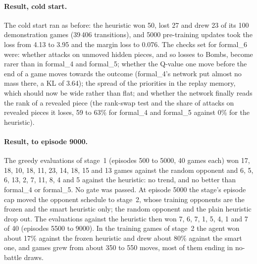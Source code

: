 \paragraph{Result, cold start.} The cold start ran as before: the heuristic
won 50, lost 27 and drew 23 of its 100 demonstration games (39\,406 transitions), and 5000
pre-training updates took the loss from 4.13 to 3.95 and the margin loss to 0.076. The checks
set for formal\_6 were: whether attacks on
unmoved hidden pieces, and so losses to Bombs, become rarer than in formal\_4 and formal\_5;
whether the Q-value one move before the end of a game moves towards the outcome (formal\_4's
network put almost no mass there, a KL of 3.64); the spread of the priorities in the replay
memory, which should now be wide rather than flat; and whether the network finally reads the
rank of a revealed piece (the rank-swap test and the share of attacks on revealed pieces it
loses, 59 to 63\% for formal\_4 and formal\_5 against 0\% for the heuristic).

\paragraph{Result, to episode 9000.} The greedy evaluations of stage~1 (episodes 500 to 5000, 40
games each) won 17, 18, 10, 18, 11, 23, 14, 18, 15 and 13 games against the random opponent and
6, 5, 6, 13, 2, 7, 11, 8, 4 and 5 against the heuristic: no trend, and no better than formal\_4
or formal\_5. No gate was passed. At episode 5000 the stage's episode cap moved the opponent
schedule to stage~2, whose training opponents are the frozen and the smart heuristic only; the
random opponent and the plain heuristic drop out. The evaluations against the heuristic then won
7, 6, 7, 1, 5, 4, 1 and 7 of 40 (episodes 5500 to 9000). In the training games of stage~2 the
agent won about 17\% against the frozen heuristic and drew about 80\% against the smart one, and
games grew from about 350 to 550 moves, most of them ending in no-battle draws.

